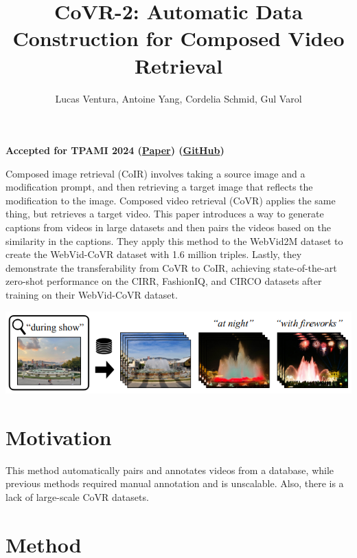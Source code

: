 \documentclass{article}
\title{CoVR-2: Automatic Data Construction for Composed Video Retrieval}
\author{Lucas Ventura, Antoine Yang, Cordelia Schmid, Gul Varol}
\date{}
\begin{document}
\maketitle

\begin{center}\textbf{Accepted for TPAMI 2024 (\href{https://arxiv.org/pdf/2308.14746}{Paper}) (\href{https://github.com/lucas-ventura/CoVR/}{GitHub})}\end{center}

Composed image retrieval (CoIR) involves taking a source image and a modification prompt, and then retrieving a target image that reflects the modification to the image. Composed video retrieval (CoVR) applies the same thing, but retrieves a target video. This paper introduces a way to generate captions from videos in large datasets and then pairs the videos based on the similarity in the captions. They apply this method to the WebVid2M dataset to create the WebVid-CoVR dataset with 1.6 million triples. Lastly, they  demonstrate the transferability from CoVR to CoIR, achieving state-of-the-art zero-shot performance on the CIRR, FashionIQ, and CIRCO datasets after training on their WebVid-CoVR dataset.

\begin{center}
    \includegraphics[scale=0.7]{covr2-1.png}
\end{center}

\section*{Motivation}

This method automatically pairs and annotates videos from a database, while previous methods required manual annotation and is unscalable. Also, there is a lack of large-scale CoVR datasets.

\section*{Method}
\end{document}
